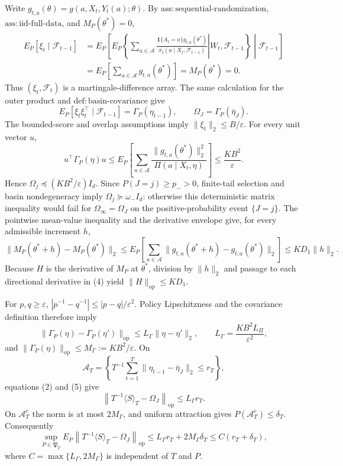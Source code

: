 Write \(g_{t,a}(\theta)=g(a,X_t,Y_t(a);\theta)\). By \(\mathrm{ass:sequential\text{-}randomization}\), \(\mathrm{ass:iid\text{-}full\text{-}data}\), and \(M_P(\theta^*)=0\),
\[
\begin{aligned}
E_P[\xi_t\mid\mathcal F_{t-1}]
&=E_P\!\left[E_P\!\left\{\left.\sum_{a\in\mathcal A}
 \frac{\mathbf 1\{A_t=a\}g_{t,a}(\theta^*)}
 {\pi_t(a\mid X_t,\mathcal F_{t-1})}
 \right|W_t,\mathcal F_{t-1}\right\}\middle|\mathcal F_{t-1}\right]\\
&=E_P\!\left[\sum_{a\in\mathcal A}g_{t,a}(\theta^*)\right]
=M_P(\theta^*)=0.
\end{aligned}
\tag{1}
\]
Thus \((\xi_t,\mathcal F_t)\) is a martingale-difference array. The same calculation for the outer product and \(\mathrm{def:basin\text{-}covariance}\) give
\[
 E_P[\xi_t\xi_t^\top\mid\mathcal F_{t-1}]
 =\Gamma_P(\eta_{t-1}),\qquad \Omega_J=\Gamma_P(\bar\eta_J).
\tag{2}
\]
The bounded-score and overlap assumptions imply \(\|\xi_t\|_2\le B/\varepsilon\). For every unit vector \(u\),
\[
 u^\top\Gamma_P(\eta)u
 \le E_P\!\left[\sum_{a\in\mathcal A}
 \frac{\|g_{t,a}(\theta^*)\|_2^2}{\Pi(a\mid X_t,\eta)}\right]
 \le \frac{KB^2}{\varepsilon}.
\tag{3}
\]
Hence \(\Omega_j\preceq(KB^2/\varepsilon)I_d\). Since \(P(J=j)\ge p_->0\), finite-tail selection and basin nondegeneracy imply \(\Omega_j\succeq\omega_-I_d\): otherwise this deterministic matrix inequality would fail for \(\Omega_\infty=\Omega_J\) on the positive-probability event \(\{J=j\}\). The pointwise mean-value inequality and the derivative envelope give, for every admissible increment \(h\),
\[
 \|M_P(\theta^*+h)-M_P(\theta^*)\|_2
 \le E_P\!\left[\sum_{a\in\mathcal A}
 \|g_{t,a}(\theta^*+h)-g_{t,a}(\theta^*)\|_2\right]
 \le KD_1\|h\|_2.
\tag{4}
\]
Because \(H\) is the derivative of \(M_P\) at \(\theta^*\), division by \(\|h\|_2\) and passage to each directional derivative in (4) yield \(\|H\|_{\mathrm{op}}\le KD_1\).

For \(p,q\ge\varepsilon\), \(|p^{-1}-q^{-1}|\le |p-q|/\varepsilon^2\). Policy Lipschitzness and the covariance definition therefore imply
\[
 \|\Gamma_P(\eta)-\Gamma_P(\eta')\|_{\mathrm{op}}
 \le L_\Gamma\|\eta-\eta'\|_2,
 \qquad L_\Gamma=\frac{KB^2L_\Pi}{\varepsilon^2},
\tag{5}
\]
and \(\|\Gamma_P(\eta)\|_{\mathrm{op}}\le M_\Gamma:=KB^2/\varepsilon\). On
\[
 \mathcal A_T=\left\{T^{-1}\sum_{t=1}^T
 \|\eta_{t-1}-\bar\eta_J\|_2\le r_T\right\},
\]
equations (2) and (5) give
\[
 \left\|T^{-1}\langle S\rangle_T-\Omega_J\right\|_{\mathrm{op}}
 \le L_\Gamma r_T.
\tag{6}
\]
On \(\mathcal A_T^c\) the norm is at most \(2M_\Gamma\), and uniform attraction gives \(P(\mathcal A_T^c)\le\delta_T\). Consequently
\[
 \sup_{P\in\mathfrak P_T}E_P\!\left\|T^{-1}\langle S\rangle_T-
 \Omega_J\right\|_{\mathrm{op}}
 \le L_\Gamma r_T+2M_\Gamma\delta_T
 \le C(r_T+\delta_T),
\tag{7}
\]
where \(C=\max\{L_\Gamma,2M_\Gamma\}\) is independent of \(T\) and \(P\).


